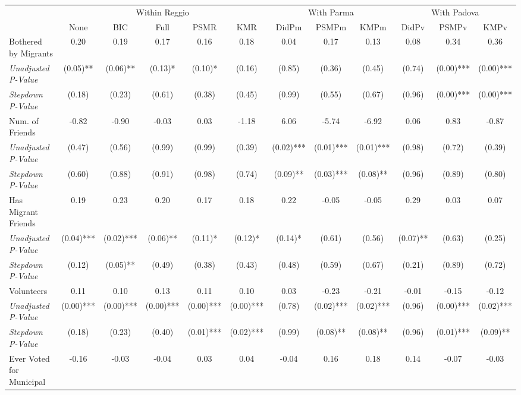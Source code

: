\begin{tabular}{l c c c c c c c c c c c}
\toprule
& \multicolumn{5}{c}{Within Reggio} & \multicolumn{3}{c}{With Parma} & \multicolumn{3}{c}{With Padova} \\\cmidrule(lr){2-6} \cmidrule(lr){7-9} \cmidrule(lr){10-12}
 & None & BIC & Full & PSMR & KMR & DidPm & PSMPm & KMPm & DidPv & PSMPv & KMPv \\
\midrule
Bothered by Migrants & 0.20 & 0.19 & 0.17 & 0.16 & 0.18 & 0.04 & 0.17 & 0.13 & 0.08 & 0.34 & 0.36 \\
\quad \textit{Unadjusted P-Value} & (0.05)** & (0.06)** & (0.13)* & (0.10)* & (0.16) & (0.85) & (0.36) & (0.45) & (0.74) & (0.00)*** & (0.00)*** \\
\quad \textit{Stepdown P-Value} & (0.18) & (0.23) & (0.61) & (0.38) & (0.45) & (0.99) & (0.55) & (0.67) & (0.96) & (0.00)*** & (0.00)*** \\
Num. of Friends & -0.82 & -0.90 & -0.03 & 0.03 & -1.18 & 6.06 & -5.74 & -6.92 & 0.06 & 0.83 & -0.87 \\
\quad \textit{Unadjusted P-Value} & (0.47) & (0.56) & (0.99) & (0.99) & (0.39) & (0.02)*** & (0.01)*** & (0.01)*** & (0.98) & (0.72) & (0.39) \\
\quad \textit{Stepdown P-Value} & (0.60) & (0.88) & (0.91) & (0.98) & (0.74) & (0.09)** & (0.03)*** & (0.08)** & (0.96) & (0.89) & (0.80) \\
Has Migrant Friends & 0.19 & 0.23 & 0.20 & 0.17 & 0.18 & 0.22 & -0.05 & -0.05 & 0.29 & 0.03 & 0.07 \\
\quad \textit{Unadjusted P-Value} & (0.04)*** & (0.02)*** & (0.06)** & (0.11)* & (0.12)* & (0.14)* & (0.61) & (0.56) & (0.07)** & (0.63) & (0.25) \\
\quad \textit{Stepdown P-Value} & (0.12) & (0.05)** & (0.49) & (0.38) & (0.43) & (0.48) & (0.59) & (0.67) & (0.21) & (0.89) & (0.72) \\
Volunteers & 0.11 & 0.10 & 0.13 & 0.11 & 0.10 & 0.03 & -0.23 & -0.21 & -0.01 & -0.15 & -0.12 \\
\quad \textit{Unadjusted P-Value} & (0.00)*** & (0.00)*** & (0.00)*** & (0.00)*** & (0.00)*** & (0.78) & (0.02)*** & (0.02)*** & (0.96) & (0.00)*** & (0.02)*** \\
\quad \textit{Stepdown P-Value} & (0.18) & (0.23) & (0.40) & (0.01)*** & (0.02)*** & (0.99) & (0.08)** & (0.08)** & (0.96) & (0.01)*** & (0.09)** \\
Ever Voted for Municipal & -0.16 & -0.03 & -0.04 & 0.03 & 0.04 & -0.04 & 0.16 & 0.18 & 0.14 & -0.07 & -0.03 \\

\end{tabular}
